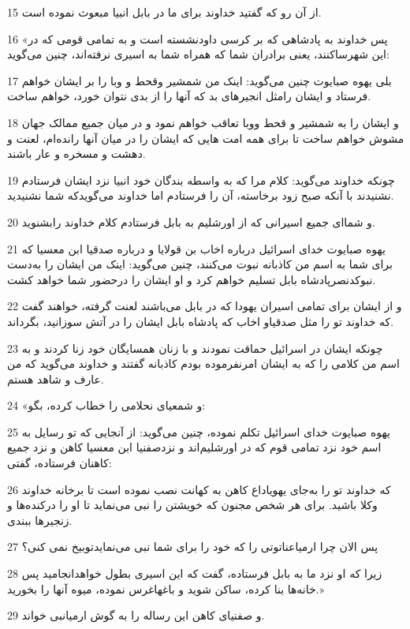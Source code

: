 \par 15 از آن رو که گفتید خداوند برای ما در بابل انبیا مبعوث نموده است.
\par 16 «پس خداوند به پادشاهی که بر کرسی داودنشسته است و به تمامی قومی که در این شهرساکنند، یعنی برادران شما که همراه شما به اسیری نرفته‌اند، چنین می‌گوید:
\par 17 بلی یهوه صبایوت چنین می‌گوید: اینک من شمشیر وقحط و وبا را بر ایشان خواهم فرستاد و ایشان رامثل انجیرهای بد که آنها را از بدی نتوان خورد، خواهم ساخت.
\par 18 و ایشان را به شمشیر و قحط ووبا تعاقب خواهم نمود و در میان جمیع ممالک جهان مشوش خواهم ساخت تا برای همه امت هایی که ایشان را در میان آنها رانده‌ام، لعنت و دهشت و مسخره و عار باشند.
\par 19 چونکه خداوند می‌گوید: کلام مرا که به واسطه بندگان خود انبیا نزد ایشان فرستادم نشنیدند با آنکه صبح زود برخاسته، آن را فرستادم اما خداوند می‌گویدکه شما نشنیدید.
\par 20 و شما‌ای جمیع اسیرانی که از اورشلیم به بابل فرستادم کلام خداوند رابشنوید.
\par 21 یهوه صبایوت خدای اسرائیل درباره اخاب بن قولایا و درباره صدقیا ابن معسیا که برای شما به اسم من کاذبانه نبوت می‌کنند، چنین می‌گوید: اینک من ایشان را به‌دست نبوکدنصرپادشاه بابل تسلیم خواهم کرد و او ایشان را درحضور شما خواهد کشت.
\par 22 و از ایشان برای تمامی اسیران یهودا که در بابل می‌باشند لعنت گرفته، خواهند گفت که خداوند تو را مثل صدقیاو اخاب که پادشاه بابل ایشان را در آتش سوزانید، بگرداند. 
\par 23 چونکه ایشان در اسرائیل حماقت نمودند و با زنان همسایگان خود زنا کردند و به اسم من کلامی را که به ایشان امرنفرموده بودم کاذبانه گفتند و خداوند می‌گوید که من عارف و شاهد هستم.
\par 24 «و شمعیای نحلامی را خطاب کرده، بگو:
\par 25 یهوه صبایوت خدای اسرائیل تکلم نموده، چنین می‌گوید: از آنجایی که تو رسایل به اسم خود نزد تمامی قوم که در اورشلیم‌اند و نزدصفنیا ابن معسیا کاهن و نزد جمیع کاهنان فرستاده، گفتی:
\par 26 که خداوند تو را به‌جای یهویاداع کاهن به کهانت نصب نموده است تا برخانه خداوند وکلا باشید. برای هر شخص مجنون که خویشتن را نبی می‌نماید تا او را درکنده‌ها و زنجیرها ببندی.
\par 27 پس الان چرا ارمیاعناتوتی را که خود را برای شما نبی می‌نمایدتوبیخ نمی کنی؟
\par 28 زیرا که او نزد ما به بابل فرستاده، گفت که این اسیری بطول خواهدانجامید پس خانه‌ها بنا کرده، ساکن شوید و باغهاغرس نموده، میوه آنها را بخورید.»
\par 29 و صفنیای کاهن این رساله را به گوش ارمیانبی خواند.
